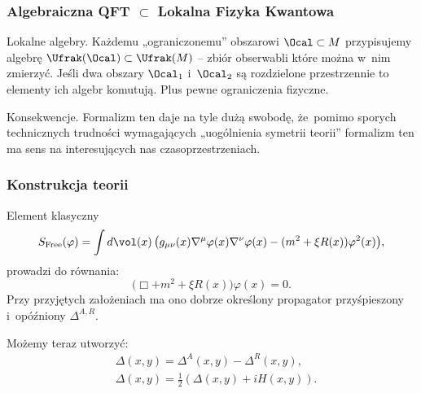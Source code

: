 \documentclass[10pt,t]{beamer}
\begin{document}
\begin{frame}
  \frametitle{Algebraiczna QFT $\subset$ Lokalna Fizyka Kwantowa}


  Lokalne algebry. Każdemu „ograniczonemu” obszarowi $\Ocal \subset M$
  przypisujemy algebrę $\Ufrak( \Ocal ) \subset \Ufrak( M )$ -- zbiór
  obserwabli które można w~nim zmierzyć. Jeśli dwa obszary $\Ocal_{ 1 }$
  i~$\Ocal_{ 2 }$ są rozdzielone przestrzennie to elementy ich algebr
  komutują. Plus pewne ograniczenia fizyczne.

  Konsekwencje. Formalizm ten daje na tyle dużą swobodę, że~pomimo sporych
  technicznych trudności wymagających „uogólnienia symetrii teorii”
  formalizm ten ma sens na interesujących nas czasoprzestrzeniach.

\end{frame}





\begin{frame}
  \frametitle{Konstrukcja teorii}


  Element klasyczny
  \begin{equation}
    \label{eq:Rachunek-zaburzen-03}
    S_{ \textrm{Free} }( \varphi ) =
    \int d \vol( x ) \, \big( g_{ \mu \nu }( x ) \nabla^{ \mu } \varphi( x ) \nabla^{ \nu } \varphi( x )
    - ( m^{ 2 } + \xi R( x ) ) \varphi^{ 2 }( x ) \big),
  \end{equation}
  prowadzi do równania:
  \begin{equation}
    \label{eq:Rachunek-zaburzen-04}
    \big( \Box  + m^{ 2 } + \xi R( x ) \big) \varphi( x ) = 0.
  \end{equation}
  Przy przyjętych założeniach ma ono dobrze określony propagator
  przyśpieszony i~opóźniony $\Delta^{ A, R }$.

  Możemy teraz utworzyć:
  \begin{subequations}
    \begin{align}
      \label{eq:Rachunek-zaburzen-05-A}
      &\Delta( x, y ) = \Delta^{ A }( x, y ) - \Delta^{ R }( x, y ), \\
      \label{eq:Rachunek-zaburzen-05-B}
      &\Delta( x, y ) = \frac{ 1 }{ 2 } \left( \Delta( x, y ) + i H( x, y ) \right).
    \end{align}
  \end{subequations}

\end{frame}
\end{document}
